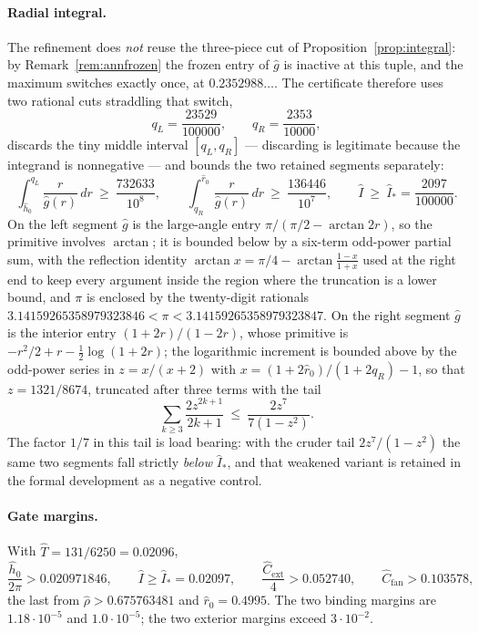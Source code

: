 \documentclass[11pt]{article}
\theoremstyle{plain}
\theoremstyle{definition}
\theoremstyle{remark}
\begin{document}
\paragraph{Radial integral.} The refinement does \emph{not} reuse the
three-piece cut of Proposition~\ref{prop:integral}: by
Remark~\ref{rem:annfrozen} the frozen entry of $\hat g$ is inactive at this
tuple, and the maximum switches exactly once, at $0.2352988\ldots$. The
certificate therefore uses two rational cuts straddling that switch,
\[
  q_{L}=\frac{23529}{100000},
  \qquad
  q_{R}=\frac{2353}{10000},
\]
discards the tiny middle interval $[q_{L},q_{R}]$ --- discarding is legitimate
because the integrand is nonnegative --- and bounds the two retained segments
separately:
\[
  \int_{\hat h_{0}}^{q_{L}}\frac{r}{\hat g(r)}\,dr\ \ge\ \frac{732633}{10^{8}},
  \qquad
  \int_{q_{R}}^{\hat r_{0}}\frac{r}{\hat g(r)}\,dr\ \ge\ \frac{136446}{10^{7}},
  \qquad
  \hat I\ \ge\ \hat I_{*}=\frac{2097}{100000}.
\]
On the left segment $\hat g$ is the large-angle entry
$\pi/(\pi/2-\arctan 2r)$, so the primitive involves $\arctan$; it is bounded
below by a six-term odd-power partial sum, with the reflection identity
$\arctan x=\pi/4-\arctan\frac{1-x}{1+x}$ used at the right end to keep every
argument inside the region where the truncation is a lower bound, and $\pi$ is
enclosed by the twenty-digit rationals
$3.14159265358979323846<\pi<3.14159265358979323847$. On the right segment
$\hat g$ is the interior entry $(1+2r)/(1-2r)$, whose primitive is
$-r^{2}/2+r-\tfrac12\log(1+2r)$; the logarithmic increment is bounded above by
the odd-power series in $z=x/(x+2)$ with $x=(1+2\hat r_{0})/(1+2q_{R})-1$, so
that $z=1321/8674$, truncated after three terms with the tail
\[
  \sum_{k\ge3}\frac{2z^{2k+1}}{2k+1}\ \le\ \frac{2z^{7}}{7(1-z^{2})} .
\]
The factor $1/7$ in this tail is load bearing: with the cruder tail
$2z^{7}/(1-z^{2})$ the same two segments fall strictly \emph{below}
$\hat I_{*}$, and that weakened variant is retained in the formal development as
a negative control.

\paragraph{Gate margins.} With $\hat T=131/6250=0.02096$,
\[
  \frac{\hat h_{0}}{2\pi}>0.020971846,
  \qquad
  \hat I\ge\hat I_{*}=0.02097,
  \qquad
  \frac{\hat C_{\mathrm{ext}}}{4}>0.052740,
  \qquad
  \hat C_{\mathrm{fan}}>0.103578,
\]
the last from $\hat\rho>0.675763481$ and $\hat r_{0}=0.4995$. The two binding
margins are $1.18\cdot10^{-5}$ and $1.0\cdot10^{-5}$; the two exterior margins
exceed $3\cdot10^{-2}$.
\end{document}
